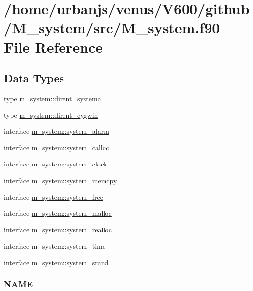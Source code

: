 \hypertarget{M__system_8f90}{}\section{/home/urbanjs/venus/\+V600/github/\+M\+\_\+system/src/\+M\+\_\+system.f90 File Reference}
\label{M__system_8f90}
\subsection*{Data Types}
\begin{DoxyCompactItemize}
\item 
type \mbox{\hyperlink{structm__system_1_1dirent__systema}{m\+\_\+system\+::dirent\+\_\+systema}}
\item 
type \mbox{\hyperlink{structm__system_1_1dirent__cygwin}{m\+\_\+system\+::dirent\+\_\+cygwin}}
\item 
interface \mbox{\hyperlink{interfacem__system_1_1system__alarm}{m\+\_\+system\+::system\+\_\+alarm}}
\item 
interface \mbox{\hyperlink{interfacem__system_1_1system__calloc}{m\+\_\+system\+::system\+\_\+calloc}}
\item 
interface \mbox{\hyperlink{interfacem__system_1_1system__clock}{m\+\_\+system\+::system\+\_\+clock}}
\item 
interface \mbox{\hyperlink{interfacem__system_1_1system__memcpy}{m\+\_\+system\+::system\+\_\+memcpy}}
\item 
interface \mbox{\hyperlink{interfacem__system_1_1system__free}{m\+\_\+system\+::system\+\_\+free}}
\item 
interface \mbox{\hyperlink{interfacem__system_1_1system__malloc}{m\+\_\+system\+::system\+\_\+malloc}}
\item 
interface \mbox{\hyperlink{interfacem__system_1_1system__realloc}{m\+\_\+system\+::system\+\_\+realloc}}
\item 
interface \mbox{\hyperlink{interfacem__system_1_1system__time}{m\+\_\+system\+::system\+\_\+time}}
\item 
interface \mbox{\hyperlink{interfacem__system_1_1system__srand}{m\+\_\+system\+::system\+\_\+srand}}
\begin{DoxyCompactList}\small\item\em \subsubsection*{N\+A\+ME}


\end{DoxyCompactList}
\end{DoxyCompactItemize}
